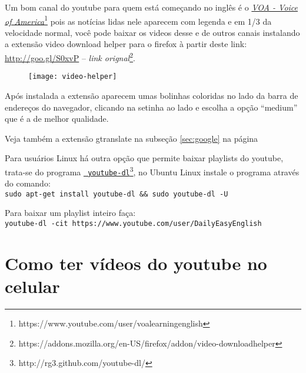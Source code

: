 \vspace{0.3\baselineskip}
\noindent
Um bom canal do  youtube para quem está começando no inglês
é o  \href{https://www.youtube.com/user/voalearningenglish}{{\em VOA
- Voice of America}}\footnote{https://www.youtube.com/user/voalearningenglish}
pois as notícias lidas nele aparecem com legenda e em 1/3 da
velocidade normal, você pode baixar os videos desse e de outros canais
instalando a extensão video download helper para o firefox à partir deste link:
\href{http://goo.gl/S0xvP}{http://goo.gl/S0xvP} -- {\em link
orignal}\footnote{https://addons.mozilla.org/en-US/firefox/addon/video-downloadhelper}.
\label{Youtube!baixar vídeos} 

\begin{figure}[h!]
	\centering
	\texttt{[image: video-helper]}
	\label{img:video-helper}
\end{figure}

\noindent
{\footnotesize {}  Após instalada a extensão aparecem umas bolinhas coloridas no
lado da barra de endereços do navegador, clicando na setinha ao lado
e escolha a opção ``medium'' que é a de melhor qualidade.}

\vspace{0.3\baselineskip}
\noindent
{\footnotesize {} Veja também a extensão gtranslate na subseção \ref{sec:google}
na página~\pageref{sec:google}}

\vspace{0.3\baselineskip} \noindent Para usuários Linux há outra opção que permite baixar
playlists do youtube, trata-se do programa
\href{http://rg3.github.com/youtube-dl/}{{\tt
youtube-dl}}\footnote{http://rg3.github.com/youtube-dl/}, no Ubuntu Linux
instale o programa através do comando:\\

{\tt sudo apt-get install youtube-dl \&\& sudo youtube-dl -U}

\vspace{0.3\baselineskip}
\noindent
Para baixar um playlist inteiro faça:\\

{\tt youtube-dl -cit  https://www.youtube.com/user/DailyEasyEnglish}

\section{Como ter vídeos do youtube no celular}
\label{sec:como_ter_v_deos_do_youtube_no_celular}

